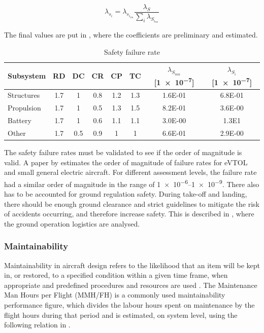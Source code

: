 \begin{equation}
    \label{eq:safety_normalised}
    \lambda_{s_{i}} = \lambda_{s_{i_{nn}}} \frac{\lambda_{S}}{\sum_{i} \lambda_{S_{i_{nn}}}}
\end{equation}

The final values are put in , where the coefficients are preliminary and estimated.
\begin{table}[H]
\caption{Safety failure rate}
\centering
\begin{tabular}{l|S[table-format=1.1]S[table-format=1.1]S[table-format=1.1]S[table-format=1.1]S[table-format=1.1]S[table-format=2.1]S[table-format=2.2]}
\toprule
\textbf{Subsystem} & \textbf{RD}  & \textbf{DC}  & \textbf{CR}  & \textbf{CP}  & \textbf{TC}  & \textbf{$\lambda_{S_{inn}}$ [\num[print-unity-mantissa=false]{1e-7}]} & \textbf{$\lambda_{S_i}$ [\num[print-unity-mantissa=false]{1e-7}]} \\ \midrule
Structures &1.7 & 1   & 0.8 & 1.2 & 1.3 & 1.6E-01 & 6.8E-01      \\
Propulsion &1.7 & 1   & 0.5 & 1.3 & 1.5 & 8.2E-01 & 3.6E-00      \\
Battery &1.7 & 1   & 0.6 & 1.1 & 1.1 & 3.0E-00 & 1.3E1      \\
Other &1.7 & 0.5 & 0.9 & 1   & 1   & 6.6E-01 & 2.9E-00     \\ \bottomrule
\end{tabular}
\label{tab:safety_analysis}
\end{table}
The safety failure rates must be validated to see if the order of magnitude is valid.
A paper by \textcite{safetyfailurerate} estimates the order of magnitude of failure rates for eVTOL and small general electric aircraft.
For different assessment levels,
the failure rate had a similar order of magnitude in the range of \numrange[print-unity-mantissa=false]{1e-6}{1e-9}.
There also has to be accounted for ground regulation safety.
During take-off and landing, there should be enough ground clearance and strict guidelines to mitigate the risk of accidents occurring, and therefore increase safety.
This is described in , where the ground operation logistics are analysed.


\subsubsection{Maintainability}
Maintainability in aircraft design refers to the likelihood that an item will be kept in, or restored, to a specified condition within a given time frame, when appropriate and predefined procedures and resources are used \cite{conlon1982test}.
The Maintenance Man Hours per Flight (MMH/FH) is a commonly used maintainability performance figure, which divides the labour hours spent on maintenance by the flight hours during that period and is estimated, on system level, using the following relation in .

